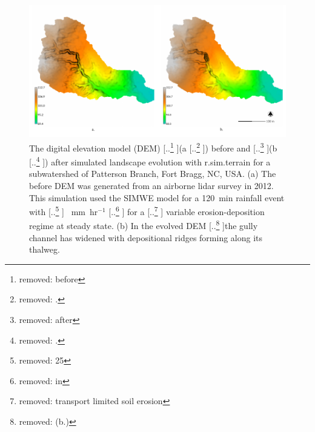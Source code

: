 \documentclass[gmd, manuscript]{copernicus}
\providecommand{\DIFadd}[1]{{\protect\color{blue} \sf #1}} %
\providecommand{\DIFdel}[1]{{\protect\color{red} [..\footnote{removed: #1} ]}} %
\providecommand{\DIFaddFL}[1]{\DIFadd{#1}} %
\providecommand{\DIFdelFL}[1]{\DIFdel{#1}} %
\providecommand{\DIFaddbeginFL}{} %
\providecommand{\DIFaddendFL}{} %
\providecommand{\DIFdelbeginFL}{} %
\providecommand{\DIFdelendFL}{} %
\begin{document}
\begin{figure}%
\center
\includegraphics[width=\textwidth,height=0.925\textheight,keepaspectratio]{figures/evolution.pdf}
\caption{
The digital elevation model (DEM) 
\DIFdelbeginFL \DIFdelFL{before }\DIFdelendFL (a\DIFdelbeginFL \DIFdelFL{.}\DIFdelendFL ) \DIFaddbeginFL \DIFaddFL{before }\DIFaddendFL and \DIFdelbeginFL \DIFdelFL{after }\DIFdelendFL (b\DIFdelbeginFL \DIFdelFL{.}\DIFdelendFL ) \DIFaddbeginFL \DIFaddFL{after
}\DIFaddendFL simulated landscape evolution with r.sim.terrain 
\DIFaddbeginFL \DIFaddFL{for a subwatershed of Patterson Branch, Fort Bragg, NC, USA}\DIFaddendFL . 
\DIFaddbeginFL \DIFaddFL{(a) The before DEM was generated from an airborne lidar survey in 2012. 
}\DIFaddendFL This simulation used the SIMWE model
for a 120~\unit{min} rainfall event with \DIFdelbeginFL \DIFdelFL{25}\DIFdelendFL \DIFaddbeginFL \DIFaddFL{50}\DIFaddendFL ~\unit{mm~hr}$^{-1}$
\DIFdelbeginFL \DIFdelFL{in }\DIFdelendFL \DIFaddbeginFL \DIFaddFL{for }\DIFaddendFL a \DIFdelbeginFL \DIFdelFL{transport limited soil erosion }\DIFdelendFL \DIFaddbeginFL \DIFaddFL{variable erosion-deposition }\DIFaddendFL regime at steady state.
\DIFaddbeginFL \DIFaddFL{(b) }\DIFaddendFL In the evolved DEM 
\DIFdelbeginFL \DIFdelFL{(b.)
}\DIFdelendFL the gully channel has widened 
with depositional ridges forming along its thalweg.}
\label{fig:evolution}
\end{figure}

\end{document}
